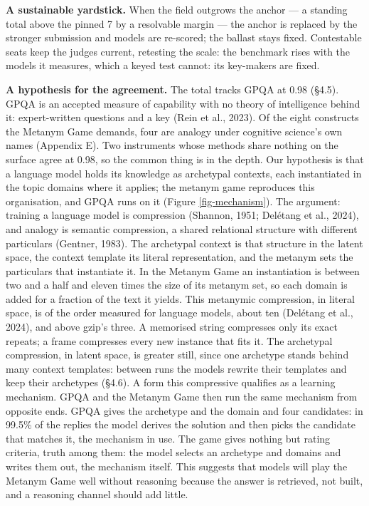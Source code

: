 \documentclass{article}
\begin{document}
\textbf{A sustainable yardstick.} When the field outgrows the anchor --- a standing total above the pinned 7 by a resolvable margin --- the anchor is replaced by the stronger submission and models are re-scored; the ballast stays fixed. Contestable seats keep the judges current, retesting the scale: the benchmark rises with the models it measures, which a keyed test cannot: its key-makers are fixed.

\textbf{A hypothesis for the agreement.} The total tracks GPQA at 0.98 (\S{}4.5). GPQA is an accepted measure of capability with no theory of intelligence behind it: expert-written questions and a key (Rein et al., 2023). Of the eight constructs the Metanym Game demands, four are analogy under cognitive science's own names (Appendix E). Two instruments whose methods share nothing on the surface agree at 0.98, so the common thing is in the depth. Our hypothesis is that a language model holds its knowledge as archetypal contexts, each instantiated in the topic domains where it applies; the metanym game reproduces this organisation, and GPQA runs on it (Figure \ref{fig-mechanism}). The argument: training a language model is compression (Shannon, 1951; Del\'{e}tang et al., 2024), and analogy is semantic compression, a shared relational structure with different particulars (Gentner, 1983). The archetypal context is that structure in the latent space, the context template its literal representation, and the metanym sets the particulars that instantiate it. In the Metanym Game an instantiation is between two and a half and eleven times the size of its metanym set, so each domain is added for a fraction of the text it yields. This metanymic compression, in literal space, is of the order measured for language models, about ten (Del\'{e}tang et al., 2024), and above gzip's three. A memorised string compresses only its exact repeats; a frame compresses every new instance that fits it. The archetypal compression, in latent space, is greater still, since one archetype stands behind many context templates: between runs the models rewrite their templates and keep their archetypes (\S{}4.6). A form this compressive qualifies as a learning mechanism. GPQA and the Metanym Game then run the same mechanism from opposite ends. GPQA gives the archetype and the domain and four candidates: in 99.5\% of the replies the model derives the solution and then picks the candidate that matches it, the mechanism in use. The game gives nothing but rating criteria, truth among them: the model selects an archetype and domains and writes them out, the mechanism itself. This suggests that models will play the Metanym Game well without reasoning because the answer is retrieved, not built, and a reasoning channel should add little.
\end{document}
